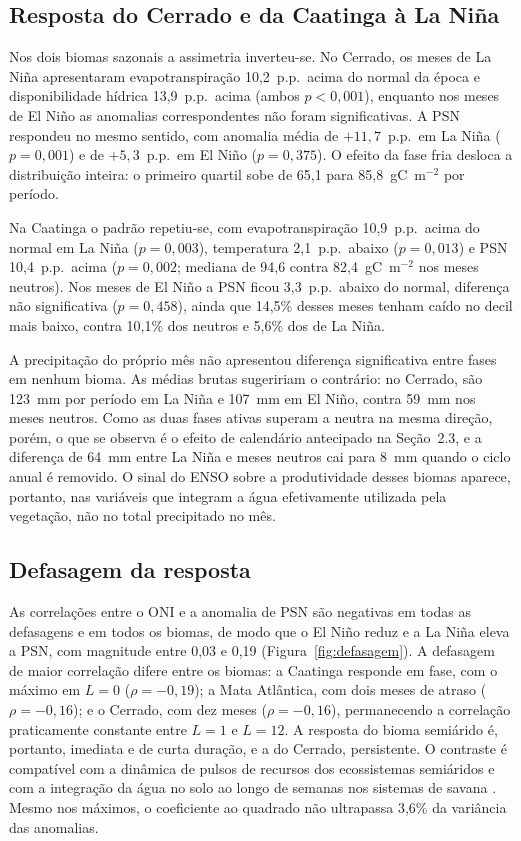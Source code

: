 \documentclass[a4paper,fleqn]{cas-sc}
\begin{document}
\subsection{Resposta do Cerrado e da Caatinga à La Niña}

Nos dois biomas sazonais a assimetria inverteu-se. No Cerrado, os meses de La Niña apresentaram evapotranspiração 10,2~p.p.\ acima do normal da época e disponibilidade hídrica 13,9~p.p.\ acima (ambos $p < 0{,}001$), enquanto nos meses de El Niño as anomalias correspondentes não foram significativas. A PSN respondeu no mesmo sentido, com anomalia média de $+11{,}7$~p.p.\ em La Niña ($p = 0{,}001$) e de $+5{,}3$~p.p.\ em El Niño ($p = 0{,}375$). O efeito da fase fria desloca a distribuição inteira: o primeiro quartil sobe de 65,1 para 85,8~gC~m$^{-2}$ por período.

Na Caatinga o padrão repetiu-se, com evapotranspiração 10,9~p.p.\ acima do normal em La Niña ($p = 0{,}003$), temperatura 2,1~p.p.\ abaixo ($p = 0{,}013$) e PSN 10,4~p.p.\ acima ($p = 0{,}002$; mediana de 94,6 contra 82,4~gC~m$^{-2}$ nos meses neutros). Nos meses de El Niño a PSN ficou 3,3~p.p.\ abaixo do normal, diferença não significativa ($p = 0{,}458$), ainda que 14,5\% desses meses tenham caído no decil mais baixo, contra 10,1\% dos neutros e 5,6\% dos de La Niña.

A precipitação do próprio mês não apresentou diferença significativa entre fases em nenhum bioma. As médias brutas sugeririam o contrário: no Cerrado, são 123~mm por período em La Niña e 107~mm em El Niño, contra 59~mm nos meses neutros. Como as duas fases ativas superam a neutra na mesma direção, porém, o que se observa é o efeito de calendário antecipado na Seção~2.3, e a diferença de 64~mm entre La Niña e meses neutros cai para 8~mm quando o ciclo anual é removido. O sinal do ENSO sobre a produtividade desses biomas aparece, portanto, nas variáveis que integram a água efetivamente utilizada pela vegetação, não no total precipitado no mês.

\subsection{Defasagem da resposta}

As correlações entre o ONI e a anomalia de PSN são negativas em todas as defasagens e em todos os biomas, de modo que o El Niño reduz e a La Niña eleva a PSN, com magnitude entre 0,03 e 0,19 (Figura~\ref{fig:defasagem}). A defasagem de maior correlação difere entre os biomas: a Caatinga responde em fase, com o máximo em $L = 0$ ($\rho = -0{,}19$); a Mata Atlântica, com dois meses de atraso ($\rho = -0{,}16$); e o Cerrado, com dez meses ($\rho = -0{,}16$), permanecendo a correlação praticamente constante entre $L = 1$ e $L = 12$. A resposta do bioma semiárido é, portanto, imediata e de curta duração, e a do Cerrado, persistente. O contraste é compatível com a dinâmica de pulsos de recursos dos ecossistemas semiáridos \citep{schwinning2004} e com a integração da água no solo ao longo de semanas nos sistemas de savana \citep{oliveira2005}. Mesmo nos máximos, o coeficiente ao quadrado não ultrapassa 3,6\% da variância das anomalias.
\end{document}
